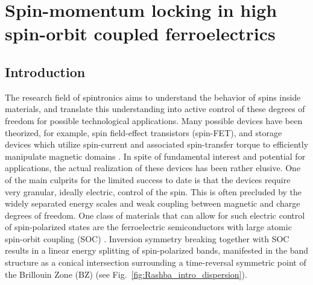 \newcommand{\unkr}{$u_n(\bm{k}, \bm{r})$}
\newcommand{\Unkr}{u_n(\bm{k}, \bm{r})}
\newcommand{\eikr}{$e^{i\bm{k}\cdot\bm{r}}$}
\newcommand{\Eikr}{e^{i\bm{k}\cdot\bm{r}}}
\chapter{Spin-momentum locking in high spin-orbit coupled ferroelectrics \label{ch:Rashba}}
\section{Introduction}
%
The research field of spintronics aims to understand the behavior of spins inside materials, and translate this understanding into active control of these degrees of freedom for possible technological applications.
Many possible devices have been theorized, for example, spin field-effect transistors (spin-FET)\cite{Datta1990}, and storage devices which utilize spin-current and associated spin-transfer torque to efficiently manipulate magnetic domains \cite{Kent2015,Jungwirth2016}.
In spite of fundamental interest and potential for applications, the actual realization of these devices has been rather elusive.
One of the main culprits for the limited success to date is that the devices require very granular, ideally electric, control of the spin.
This is often precluded by the widely separated energy scales and weak coupling between magnetic and charge degrees of freedom.
One class of materials that can allow for such electric control of spin-polarized states are the ferroelectric semiconductors with large atomic spin-orbit coupling (SOC) \cite{DiSante2013,Ishizaka2011,Kim2014}.
Inversion symmetry breaking together with SOC results in a linear energy splitting of spin-polarized bands, manifested in the band structure as a conical intersection surrounding a time-reversal symmetric point of the Brillouin Zone (BZ) (see Fig.~\ref{fig:Rashba_intro_dispersion}).
